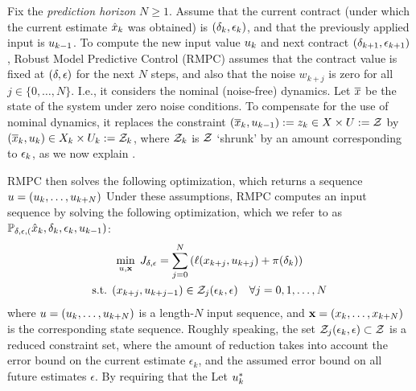 Fix the \emph{prediction horizon} $N \geq 1$.
Assume that the current contract (under which the current estimate $\hat{x}_k$ was obtained) is $(\delta_{k},\epsilon_{k})$, and that the previously applied input is $u_{k-1}$.
To compute the new input value $u_{k}$ and next contract $(\delta_{k+1},\epsilon_{k+1})$, Robust Model Predictive Control (RMPC) assumes that the contract value is fixed at $(\delta,\epsilon)$ for the next $N$ steps, and also that the noise $w_{k+j}$ is zero for all $j \in \{0,\ldots,N\}$.
I.e., it considers the nominal (noise-free) dynamics.
Let $\overline{x}$ be the state of the system under zero noise conditions.
To compensate for the use of nominal dynamics, it replaces the constraint $(\overline{x}_k,u_{k-1}):= z_k \in X \times U := \mathcal{Z}$
by $(\overline{x}_k,u_k) \in X_k \times U_k := \mathcal{Z}_k$,
where $\mathcal{Z}_k$ is $\mathcal{Z}$ `shrunk' by an amount corresponding to $\epsilon_k$, as we now explain .

RMPC then solves the following optimization, which returns a sequence $u = (u_k,\ldots,u_{k+N})$
Under these assumptions, RMPC computes an input sequence by solving the following optimization, which we refer to as $\mathbb{P_{\delta,\epsilon,(}}\hat{x}_{k},\delta_k,\epsilon_k,u_{k-1})$:
\begin{gather*}
\min_{u,\mathbf{x}} \; J_{\delta,\epsilon} = \sum_{j=0}^{N}\left(\ell(x_{k+j},u_{k+j})+\pi(\delta_k)\right) \\
\textrm{s.t. }
(x_{k+j},u_{k+j-1}) \in \mathcal{Z}_j(\epsilon_k,\epsilon)\quad \forall j = 0,1,\ldots,N\\
\end{gather*}
where $u = (u_k,\ldots,u_{k+N})$ is a length-$N$ input sequence, and $\mathbf{x} = (x_k,\ldots,x_{k+N})$ is the corresponding state sequence.
Roughly speaking, the set $\mathcal{Z}_j(\epsilon_k,\epsilon) \subset \mathcal{Z}$ is a reduced constraint set, where the amount of reduction takes into account the error bound on the current estimate $\epsilon_k$, and the assumed error bound on all future estimates $\epsilon$.
By requiring that the
Let $u^*_k$



